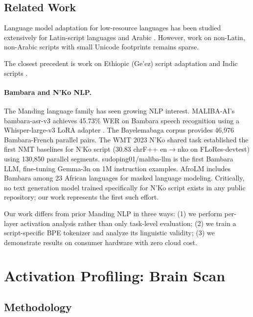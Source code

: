 \documentclass[11pt]{article}
\begin{document}
\subsection{Related Work}

Language model adaptation for low-resource languages has been studied extensively for Latin-script languages \cite{conneau2020unsupervised, pfeiffer2020adapterhub} and Arabic \cite{antoun2020arabert}.
However, work on non-Latin, non-Arabic scripts with small Unicode footprints remains sparse.

The closest precedent is work on Ethiopic (Ge'ez) script adaptation \cite{tonja2023natural} and Indic scripts \cite{kakwani2020indicnlpsuite}.

\paragraph{Bambara and N'Ko NLP.}
The Manding language family has seen growing NLP interest.
MALIBA-AI's bambara-asr-v3 achieves 45.73\% WER on Bambara speech recognition using a Whisper-large-v3 LoRA adapter \cite{maliba2024bambara}.
The Bayelemabaga corpus \cite{bayelemabaga2025} provides 46,976 Bambara-French parallel pairs.
The WMT 2023 N'Ko shared task \cite{wmt2023nko} established the first NMT baselines for N'Ko script (30.83 chrF++ en$\to$nko on FLoRes-devtest) using 130,850 parallel segments.
sudoping01/maliba-llm is the first Bambara LLM, fine-tuning Gemma-3n on 1M instruction examples.
AfroLM \cite{dossou2022afrolm} includes Bambara among 23 African languages for masked language modeling.
Critically, no text generation model trained specifically for N'Ko script exists in any public repository; our work represents the first such effort.

Our work differs from prior Manding NLP in three ways: (1) we perform per-layer activation analysis rather than only task-level evaluation; (2) we train a script-specific BPE tokenizer and analyze its linguistic validity; (3) we demonstrate results on consumer hardware with zero cloud cost.

\section{Activation Profiling: Brain Scan}
\label{sec:brain-scan}

\subsection{Methodology}
\end{document}
